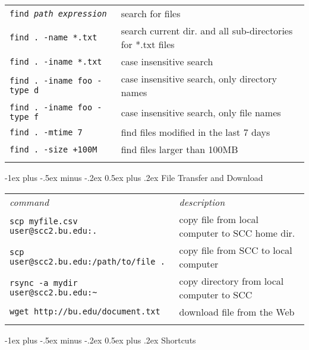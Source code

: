 \documentclass[10pt,landscape]{article}
\makeatletter
\renewcommand{\section}{\@startsection{section}{1}{0mm}%
                                {-1ex plus -.5ex minus -.2ex}%
                                {0.5ex plus .2ex}%
                                {\normalfont\large\bfseries}}
\makeatother
\begin{document}
\begin{multicols}{2}
\begin{tabular}{ll}
\texttt{find \textit{path expression}} & search for files\\
\texttt{find . -name *.txt} & search current dir. and all sub-directories for *.txt files\\
\texttt{find . -iname *.txt} & case insensitive search\\
\texttt{find . -iname foo -type d} & case insensitive search, only directory names \\
\texttt{find . -iname foo -type f} & case insensitive search, only file names \\
\texttt{find . -mtime 7} & find files modified in the last 7 days \\
\texttt{find . -size +100M} & find files larger than 100MB \\

\\
\end{tabular}
\section{File Transfer and Download}
\begin{tabular}{ll}

\emph{command} & \emph{description} \\
\texttt{scp myfile.csv user@scc2.bu.edu:.} & copy file from local computer to SCC home dir.\\
\texttt{scp user@scc2.bu.edu:/path/to/file .} & copy file from SCC to local computer \\
\texttt{rsync -a mydir user@scc2.bu.edu:\~{}} & copy directory from local computer to SCC  \\
\texttt{wget http://bu.edu/document.txt} & download file from the Web  \\
\\
\end{tabular}

\section{Shortcuts}
\begin{tabular}{ll}


\end{tabular}
\end{multicols}
\end{document}
